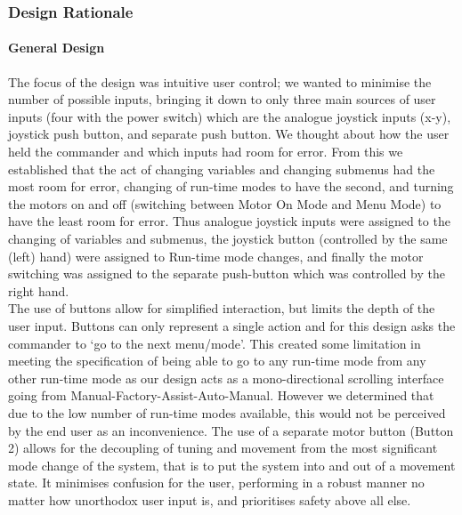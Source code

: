 	
	\subsubsection{Design Rationale}
	\paragraph{General Design}
	The focus of the design was intuitive user control; we wanted to minimise the number of possible inputs, bringing it down to only three main sources of user inputs (four with the power switch) which are the analogue joystick inputs (x-y), joystick push button, and separate push button. We thought about how the user held the commander and which inputs had room for error. From this we established that the act of changing variables and changing submenus had the most room for error, changing of run-time modes to have the second, and turning the motors on and off (switching between Motor On Mode and Menu Mode) to have the least room for error. Thus analogue joystick inputs were assigned to the changing of variables and submenus, the joystick button (controlled by the same (left) hand) were assigned to Run-time mode changes, and finally the motor switching was assigned to the separate push-button which was controlled by the right hand.\\
	
	The use of buttons allow for simplified interaction, but limits the depth of the user input. Buttons can only represent a single action and for this design asks the commander to `go to the next menu/mode'. This created some limitation in meeting the specification of being able to go to any run-time mode from any other run-time mode as our design acts as a mono-directional scrolling interface going from Manual-Factory-Assist-Auto-Manual. However we determined that due to the low number of run-time modes available, this would not be perceived by the end user as an inconvenience. The use of a separate motor button (Button 2) allows for the decoupling of tuning and movement from the most significant mode change of the system, that is to put the system into and out of a movement state. It minimises confusion for the user, performing in a robust manner no matter how unorthodox user input is, and prioritises safety above all else.
	

